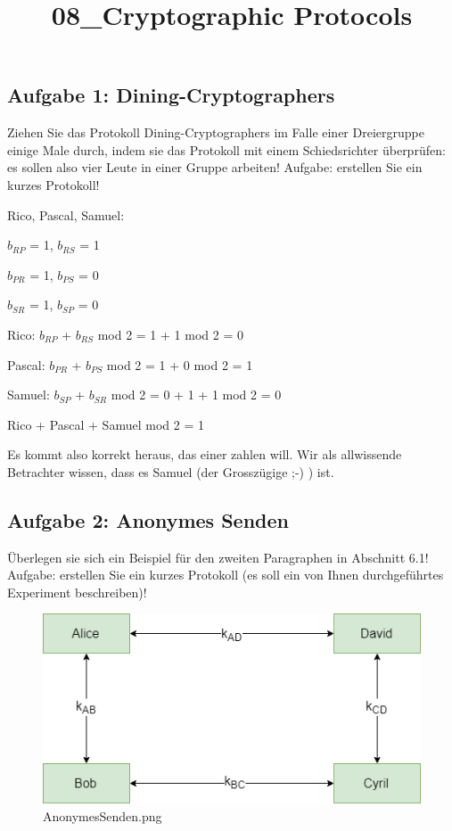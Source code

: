 \documentclass[11pt]{article}
\title{08\_Cryptographic Protocols}
\makeatletter
\def\maxwidth{\ifdim\Gin@nat@width>\linewidth\linewidth
    \else\Gin@nat@width\fi}
\let\Oldincludegraphics\includegraphics
\renewcommand{\includegraphics}[1]{\Oldincludegraphics[width=.8\maxwidth]{#1}}
\makeatother
\begin{document}
    
    
    \maketitle
    
    

    
    \subsection{Aufgabe 1:
Dining-Cryptographers}\label{aufgabe-1-dining-cryptographers}

    Ziehen Sie das Protokoll Dining-Cryptographers im Falle einer
Dreiergruppe einige Male durch, indem sie das Protokoll mit einem
Schiedsrichter überprüfen: es sollen also vier Leute in einer Gruppe
arbeiten! Aufgabe: erstellen Sie ein kurzes Protokoll!

    Rico, Pascal, Samuel:

\(b_{RP}\) = 1, \(b_{RS}\) = 1

\(b_{PR}\) = 1, \(b_{PS}\) = 0

\(b_{SR}\) = 1, \(b_{SP}\) = 0

Rico: \(b_{RP}\) + \(b_{RS}\) mod 2 = 1 + 1 mod 2 = 0

Pascal: \(b_{PR}\) + \(b_{PS}\) mod 2 = 1 + 0 mod 2 = 1

Samuel: \(b_{SP}\) + \(b_{SR}\) mod 2 = 0 + 1 + 1 mod 2 = 0

Rico + Pascal + Samuel mod 2 = 1

Es kommt also korrekt heraus, das einer zahlen will. Wir als allwissende
Betrachter wissen, dass es Samuel (der Grosszügige ;-) ) ist.

    \subsection{Aufgabe 2: Anonymes Senden}\label{aufgabe-2-anonymes-senden}

    Überlegen sie sich ein Beispiel für den zweiten Paragraphen in Abschnitt
6.1! Aufgabe: erstellen Sie ein kurzes Protokoll (es soll ein von Ihnen
durchgeführtes Experiment beschreiben)!

    \begin{figure}
\centering
\includegraphics{img/AnonymesSenden.png}
\caption{AnonymesSenden.png}
\end{figure}
\end{document}
